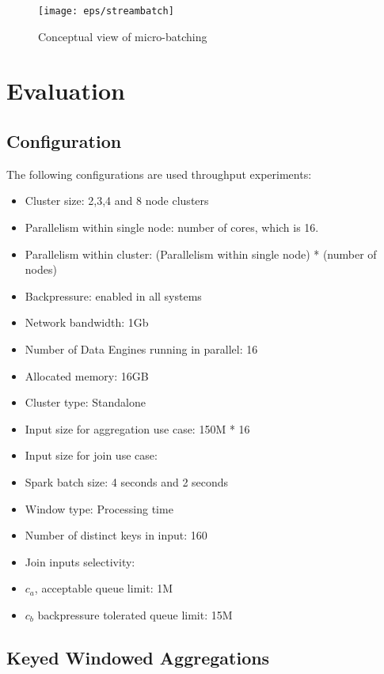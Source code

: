 \begin{figure}[h]
\centering
\texttt{[image: eps/streambatch]}
\caption{Conceptual view of micro-batching}
\label{fig_micro_batch}
\end{figure}







\section{Evaluation}
\subsection{Configuration}
The following configurations are used throughput experiments:
\begin{itemize}
\item Cluster size: 2,3,4 and 8 node clusters
\item Parallelism within single node: number of cores, which is 16.
\item Parallelism within cluster: (Parallelism within single node) * (number of nodes)

\item Backpressure: enabled in all systems
\item Network bandwidth: 1Gb
\item Number of Data Engines running in parallel: 16
\item Allocated memory: 16GB
\item Cluster type: Standalone
\item Input size for aggregation use case: 150M * 16
\item Input size for join use case: 
\item Spark batch size: 4 seconds and 2 seconds
\item Window type: Processing time
\item Number of distinct keys in input: 160
\item Join inputs selectivity: 
\item $c_{a}$, acceptable queue limit: 1M
\item $c_{b}$ backpressure tolerated queue limit: 15M
\end{itemize}

\subsection{Keyed Windowed Aggregations}

